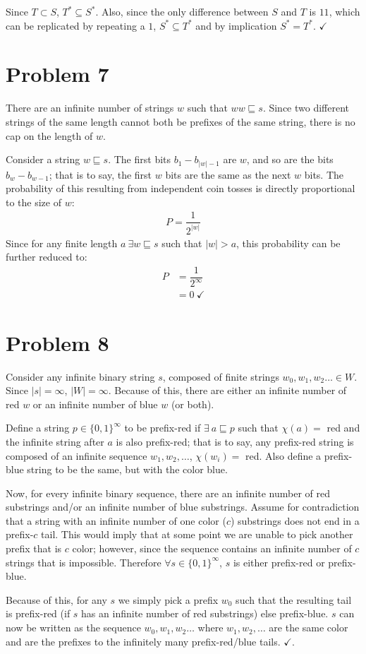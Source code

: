 \documentclass[11pt]{article}
\begin{document}
Since $T \subset S$, $T^* \subseteq S^*$. Also, since the only difference between $S$ and $T$ is $11$, which can be replicated by repeating a $1$, $S^* \subseteq T^*$ and by implication $S^* = T^*$. $\checkmark$

\section*{Problem 7}
There are an infinite number of strings $w$ such that $ww \sqsubseteq s$. Since two different strings of the same length cannot both be prefixes of the same string, there is no cap on the length of $w$.

Consider a string $w \sqsubseteq s$.  The first bits $b_1 - b_{|w| -1}$ are $w$, and so are the bits $b_{w} - b_{w-1}$; that is to say, the first $w$ bits are the same as the next $w$ bits. The probability of this resulting from independent coin tosses is directly proportional to the size of $w$:
	\begin{align*}
	P = \dfrac{1}{2^{|w|}}
	\end{align*}
Since for any finite length $a\ \exists w \sqsubseteq s$ such that $|w| > a$, this probability can be further reduced to:
	\begin{align*}
	P &= \dfrac{1}{2^{\infty}} \\
	&=0\ \checkmark
	\end{align*}
	

\section*{Problem 8}
Consider any infinite binary string $s$, composed of finite strings $w_0, w_1, w_2  \dots \in W$. Since $|s| = \infty$, $|W| = \infty$. Because of this, there are either an infinite number of red $w$ or an infinite number of blue $w$ (or both).

Define a string $p \in \{0,1\}^{\infty}$ to be prefix-red if $\exists \ a \sqsubseteq p $ such that $\chi(a) =$ red and the infinite string after $a$ is also prefix-red; that is to say, any prefix-red string is composed of an infinite sequence $w_1, w_2, \dots$, $\chi(w_i) =$ red. Also define a prefix-blue string to be the same, but with the color blue.

Now, for every infinite binary sequence, there are an infinite number of red substrings and/or an infinite number of blue substrings. Assume for contradiction that a string with an infinite number of one color ($c$) substrings does not end in a prefix-$c$ tail. This would imply that at some point we are unable to pick another prefix that is $c$ color; however, since the sequence contains an infinite number of $c$ strings that is impossible. Therefore $\forall s \in \{0,1\}^{\infty}$, $s$ is either prefix-red or prefix-blue.

Because of this, for any $s$ we simply pick a prefix $w_0$ such that the resulting tail is prefix-red (if $s$ has an infinite number of red substrings) else prefix-blue. $s$ can now be written as the sequence $w_0, w_1, w_2  \dots $ where $w_1, w_2, \dots$ are the same color and are the prefixes to the infinitely many prefix-red/blue tails. $\checkmark$.
\end{document}
